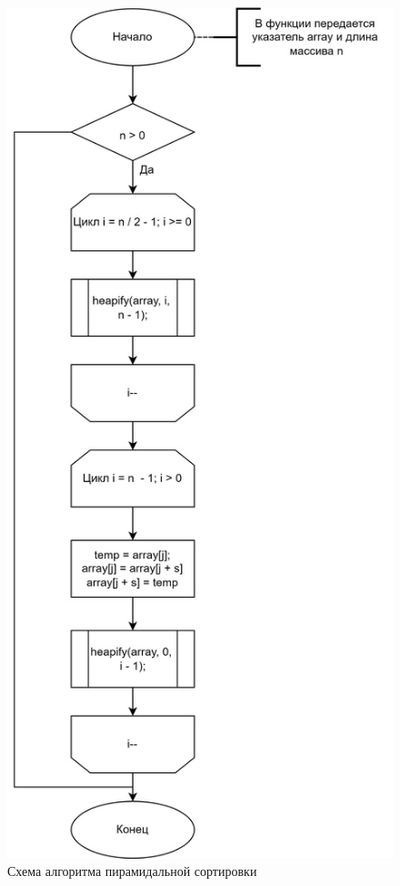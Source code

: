 \clearpage

\begin{figure}[h]
	\centering
	\includegraphics[height=0.8\textheight]{img/heap_1.png}
	\caption{Схема алгоритма пирамидальной сортировки}
	\label{fig:heap_1}
\end{figure}

